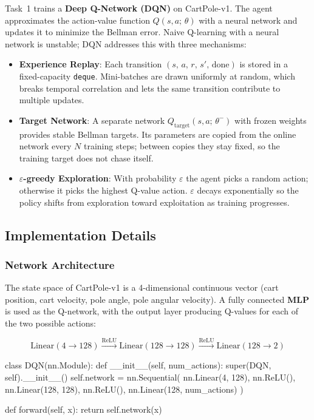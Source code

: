 \documentclass[12pt,a4paper]{report}
\begin{document}
Task~1 trains a \textbf{Deep Q-Network (DQN)} on CartPole-v1.
The agent approximates the action-value function $Q(s, a;\,\theta)$ with a neural network
and updates it to minimize the Bellman error.
Naive Q-learning with a neural network is unstable; DQN addresses this with three mechanisms:

\begin{itemize}[leftmargin=1.8em]
  \item \textbf{Experience Replay}: Each transition $(s,\,a,\,r,\,s',\,\text{done})$ is
        stored in a fixed-capacity \texttt{deque}.
        Mini-batches are drawn uniformly at random, which breaks temporal correlation and
        lets the same transition contribute to multiple updates.

  \item \textbf{Target Network}: A separate network $Q_{\text{target}}(s,a;\,\theta^-)$
        with frozen weights provides stable Bellman targets.
        Its parameters are copied from the online network every $N$ training steps;
        between copies they stay fixed, so the training target does not chase itself.

  \item \textbf{$\varepsilon$-greedy Exploration}: With probability $\varepsilon$ the agent
        picks a random action; otherwise it picks the highest Q-value action.
        $\varepsilon$ decays exponentially so the policy shifts from exploration toward
        exploitation as training progresses.
\end{itemize}

\subsection{Implementation Details}

\subsubsection*{Network Architecture}

The state space of CartPole-v1 is a 4-dimensional continuous vector
(cart position, cart velocity, pole angle, pole angular velocity).
A fully connected \textbf{MLP} is used as the Q-network, with the output layer
producing Q-values for each of the two possible actions:

\[
  \text{Linear}(4\!\to\!128) \xrightarrow{\text{ReLU}}
  \text{Linear}(128\!\to\!128) \xrightarrow{\text{ReLU}}
  \text{Linear}(128\!\to\!2)
\]

\begin{pycode}
class DQN(nn.Module):
    def __init__(self, num_actions):
        super(DQN, self).__init__()
        self.network = nn.Sequential(
            nn.Linear(4, 128),
            nn.ReLU(),
            nn.Linear(128, 128),
            nn.ReLU(),
            nn.Linear(128, num_actions)
        )

    def forward(self, x):
        return self.network(x)
\end{pycode}
\end{document}
